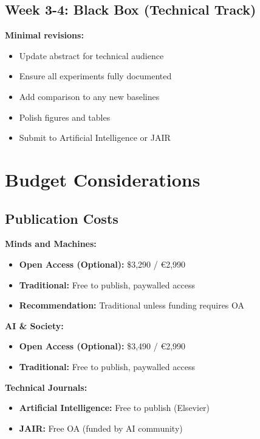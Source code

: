 \documentclass[12pt]{article}
\begin{document}
\subsection{Week 3-4: Black Box (Technical Track)}

\textbf{Minimal revisions:}
\begin{itemize}[leftmargin=*]
\item Update abstract for technical audience
\item Ensure all experiments fully documented
\item Add comparison to any new baselines
\item Polish figures and tables
\item Submit to Artificial Intelligence or JAIR
\end{itemize}

\section{Budget Considerations}

\subsection{Publication Costs}

\textbf{Minds and Machines:}
\begin{itemize}[leftmargin=*]
\item \textbf{Open Access (Optional):} \$3,290 / €2,990
\item \textbf{Traditional:} Free to publish, paywalled access
\item \textbf{Recommendation:} Traditional unless funding requires OA
\end{itemize}

\textbf{AI \& Society:}
\begin{itemize}[leftmargin=*]
\item \textbf{Open Access (Optional):} \$3,490 / €2,990
\item \textbf{Traditional:} Free to publish, paywalled access
\end{itemize}

\textbf{Technical Journals:}
\begin{itemize}[leftmargin=*]
\item \textbf{Artificial Intelligence:} Free to publish (Elsevier)
\item \textbf{JAIR:} Free OA (funded by AI community)
\end{itemize}
\end{document}
